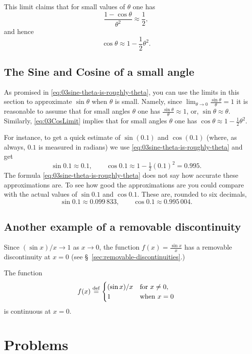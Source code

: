 This limit claims that for small values of $\theta$ one has
\[
\frac{1-\cos\theta}{\theta^2} \approx \frac{1}{2},
\]
and hence
\[
\cos \theta \approx 1 - \frac{1}{2}\theta^2.
\]


\subsection{The Sine and Cosine of a small angle}
As promised in  \eqref{eq:03sine-theta-is-roughly-theta}, you can use
the limits in this section to approximate $\sin\theta$ when $\theta$
is small.  Namely, since $\lim_{\theta\to0}\frac{\sin\theta}{\theta} = 1$ it is
reasonable to assume that for small angles $\theta$ one has
$\frac{\sin\theta}{\theta}\approx 1$, or, $\sin\theta \approx \theta$.
Similarly, \eqref{eq:03CosLimit} implies that for small angles
$\theta$ one has $\cos\theta \approx 1 - \frac12\theta^2$.

For instance, to get a quick estimate of $\sin(0.1)$ and $\cos(0.1)$
(where, as always, $0.1$ is measured in radians)
we use \eqref{eq:03sine-theta-is-roughly-theta} and get
\[
\sin 0.1 \approx 0.1, \qquad
\cos 0.1 \approx 1-\tfrac12(0.1)^2 = 0.995.
\]
The formula \eqref{eq:03sine-theta-is-roughly-theta} does not say how
accurate these approximations are.  To see how good the approximations
are you could compare with the actual values of $\sin 0.1$ and $\cos
0.1$.  These are, rounded to six decimals,
\[
\sin 0.1 \approx 0.099\,833,\qquad
\cos 0.1 \approx 0.995\,004.
\]

\subsection{Another example of a removable discontinuity}
\label{sec:another-example-of-removable-discontinuity}
Since $(\sin x) /x\to1$ as $x\to0$, the function $f(x) = \frac{\sin x}
{x}$ has a removable discontinuity at $x=0$ (see
\S~\ref{sec:removable-discontinuities}.)

\centerline{}

\noindent%
The function
\[
f(x) \stackrel{\rm def}=
\begin{cases}
  (\sin x)/x & \text{for }x\neq0,\\
  1 & \text{when }x=0
\end{cases}
\]
is continuous at $x=0$.

\section{Problems}
\problemfont


